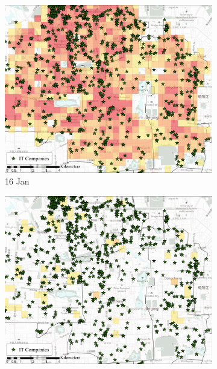 \documentclass[preprints,ijgi,submit,moreauthors]{Definitions/mdpi}
\begin{document}
\begin{figure}[H]
    \centering
    \begin{subfigure}{.32\textwidth}
        \includegraphics[width=\textwidth]{Figures/Relation_with_POIs/POIsITD2020_01_16.pdf}
        \caption{16 Jan}
    \end{subfigure}
    \begin{subfigure}{.32\textwidth}
        \includegraphics[width=\textwidth]{Figures/Relation_with_POIs/POIsITD2020_02_15.pdf}

\end{subfigure}
\end{figure}
\end{document}
